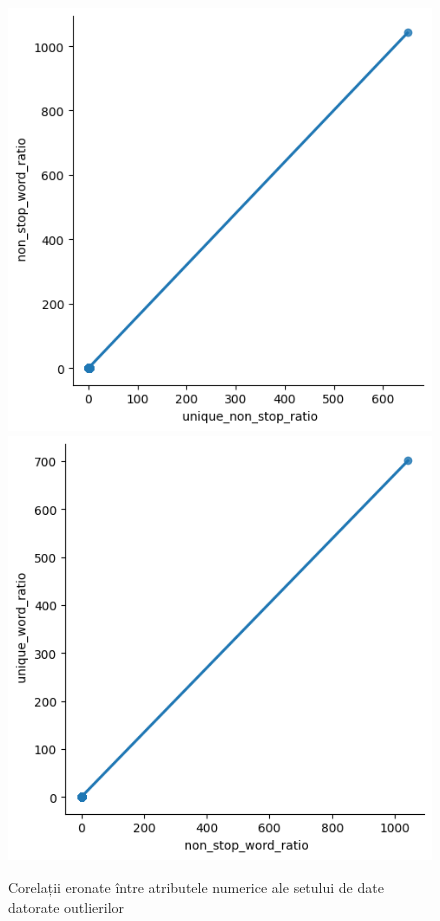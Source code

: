 \documentclass{article}
\begin{document}
\begin{figure}[htb]
    \centering
    \includegraphics[scale=0.5]{news_popularity/analysis/correlation/nonstop-unique.png}
    \includegraphics[scale=0.5]{news_popularity/analysis/correlation/unique-nonstop.png}
    \caption{Corelații eronate între atributele numerice ale setului de date
    datorate outlierilor}
    \label{fig:news:invalid_corr_graphs}
\end{figure}
\end{document}
